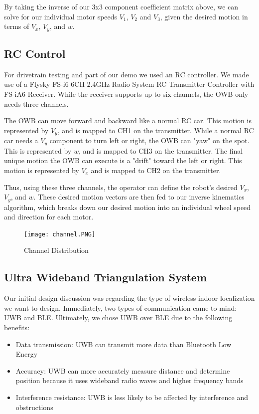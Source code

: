 \documentclass{report}
\begin{document}
    By taking the inverse of our 3x3 component coefficient matrix above, we can solve for our individual motor speeds $V_1$, $V_2$ and $V_3$, given the desired motion in terms of $V_x$, $V_y$, and $w$.

    \subsection{RC Control}
    For drivetrain testing and part of our demo we used an RC controller. We made use of a Flysky FS-i6 6CH 2.4GHz Radio System RC Transmitter Controller with FS-iA6 Receiver. While the receiver supports up to six channels, the OWB only needs three channels. 

    The OWB can move forward and backward like a normal RC car. This motion is represented by $V_y$, and is mapped to CH1 on the transmitter. While a normal RC car needs a $V_y$ component to turn left or right, the OWB can "yaw" on the spot. This is represented by $w$, and is mapped to CH3 on the transmitter. The final unique motion the OWB can execute is a "drift" toward the left or right. This motion is represented by $V_x$ and is mapped to CH2 on the transmitter.

    Thus, using these three channels, the operator can define the robot's desired $V_x$, $V_y$, and $w$. These desired motion vectors are then fed to our inverse kinematics algorithm, which breaks down our desired motion into an individual wheel speed and direction for each motor.

    \begin{figure}[ht!]
    \begin{center}
        \texttt{[image: channel.PNG]}\\
        \caption{ Channel Distribution  } 
        \label{}
    \end{center}
    \end{figure}
    

    \subsection{Ultra Wideband Triangulation System}
    Our initial design discussion was regarding the type of wireless indoor localization we want to design. Immediately, two types of communication came to mind: UWB and BLE. Ultimately, we chose UWB over BLE due to the following benefits:

    \begin{itemize}
      \item Data transmission: UWB can transmit more data than Bluetooth Low Energy
      \item Accuracy: UWB can more accurately measure distance and determine position because it uses wideband radio waves and higher frequency bands
      \item Interference resistance: UWB is less likely to be affected by interference and obstructions
    \end{itemize}
\end{document}
